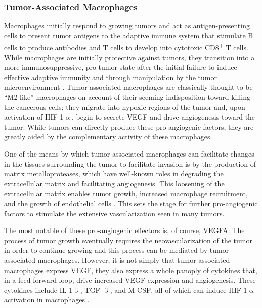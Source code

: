 \subsubsection{Tumor\hyp{}Associated Macrophages}\label{tams}

Macrophages initially respond to growing tumors and act as antigen\hyp{}presenting cells to present tumor antigens to the adaptive immune system that stimulate B cells to produce antibodies and T cells to develop into cytotoxic CD8\textsuperscript{+} T cells. While macrophages are initially protective against tumors, they transition into a more immunosuppressive, pro\hyp{}tumor state after the initial failure to induce effective adaptive immunity and through manipulation by the tumor microenvironment \citep{Noy2014}. Tumor\hyp{}associated macrophages are classically thought to be ``M2\hyp{}like'' macrophages on account of their seeming indisposition toward killing the cancerous cells; they migrate into hypoxic regions of the tumor and, upon activation of HIF\hyp{}1$\upalpha$, begin to secrete VEGF and drive angiogenesis toward the tumor. While tumors can directly produce these pro\hyp{}angiogenic factors, they are greatly aided by the complementary activity of these macrophages.

One of the means by which tumor\hyp{}associated macrophages can facilitate changes in the tissues surrounding the tumor to facilitate invasion is by the production of matrix metalloproteases, which have well\hyp{}known roles in degrading the extracellular matrix and facilitating angiogenesis. This loosening of the extracellular matrix enables tumor growth, increased macrophage recruitment, and the growth of endothelial cells \citep{Lamagna2006}. This sets the stage for further pro\hyp{}angiogenic factors to stimulate the extensive vascularization seen in many tumors.

The most notable of these pro\hyp{}angiogenic effectors is, of course, VEGFA. The process of tumor growth eventually requires the neovascularization of the tumor in order to continue growing and this process can be mediated by tumor\hyp{}associated macrophages. However, it is not simply that tumor\hyp{}associated macrophages express VEGF, they also express a whole panoply of cytokines that, in a feed\hyp{}forward loop, drive increased VEGF expression and angiogenesis. These cytokines include IL\hyp{}1$\upbeta$, TGF\hyp{}$\upbeta$, and M\hyp{}CSF, all of which can induce HIF\hyp{}1$\upalpha$ activation in macrophages \citep{Nicholas2010, Guo2016}.

